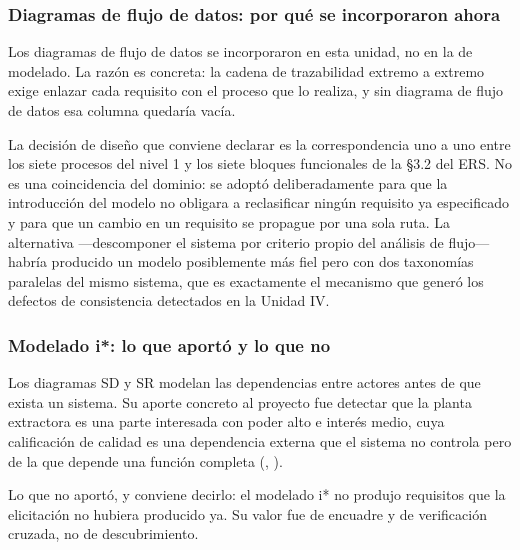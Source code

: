 \subsubsection*{Diagramas de flujo de datos: por qué se incorporaron ahora}

Los diagramas de flujo de datos se incorporaron en esta unidad, no en la de modelado. La razón es
concreta: la cadena de trazabilidad extremo a extremo exige enlazar cada requisito con el proceso que
lo realiza, y sin diagrama de flujo de datos esa columna quedaría vacía.

La decisión de diseño que conviene declarar es la correspondencia uno a uno entre los siete procesos
del nivel 1 y los siete bloques funcionales de la \S3.2 del ERS. No es una coincidencia del dominio:
se adoptó deliberadamente para que la introducción del modelo no obligara a reclasificar ningún
requisito ya especificado y para que un cambio en un requisito se propague por una sola ruta. La
alternativa ---descomponer el sistema por criterio propio del análisis de flujo--- habría producido
un modelo posiblemente más fiel pero con dos taxonomías paralelas del mismo sistema, que es
exactamente el mecanismo que generó los defectos de consistencia detectados en la Unidad IV.

\subsubsection*{Modelado i*: lo que aportó y lo que no}

Los diagramas SD y SR modelan las dependencias entre actores antes de que exista un sistema. Su
aporte concreto al proyecto fue detectar que la planta extractora es una parte interesada con poder
alto e interés medio, cuya calificación de calidad es una dependencia externa que el sistema no
controla pero de la que depende una función completa (, ).

Lo que no aportó, y conviene decirlo: el modelado i* no produjo requisitos que la elicitación no
hubiera producido ya. Su valor fue de encuadre y de verificación cruzada, no de descubrimiento.

